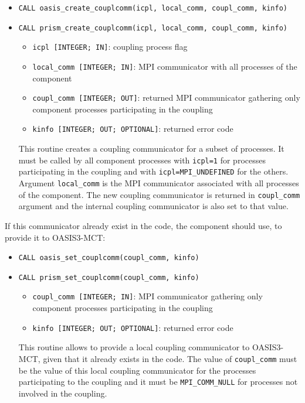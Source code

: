 \begin{itemize}
\item {\tt CALL oasis\_create\_couplcomm(icpl, local\_comm, coupl\_comm, kinfo)} 
\item {\tt CALL prism\_create\_couplcomm(icpl, local\_comm, coupl\_comm, kinfo)}
\begin{itemize}
\item {\tt icpl [INTEGER; IN]}: coupling process flag
\item {\tt local\_comm [INTEGER; IN]}: MPI communicator with all processes of the component
\item {\tt coupl\_comm [INTEGER; OUT]}: returned MPI communicator gathering only component processes participating in the coupling
\item {\tt kinfo [INTEGER; OUT; OPTIONAL]}: returned error code
\end{itemize}

This routine creates a coupling communicator for a subset of processes. It must be called by all component processes with {\tt icpl=1} for processes participating in the coupling and with {\tt icpl=MPI\_UNDEFINED} for the others. Argument {\tt local\_comm} is the MPI communicator associated with all processes of the component. The new coupling communicator is returned in {\tt coupl\_comm} argument and the internal coupling communicator is also set to that value.  
\end{itemize}

If this communicator already exist in the code, the component should use, to provide it to OASIS3-MCT:  

\begin{itemize} 
\item {\tt CALL oasis\_set\_couplcomm(coupl\_comm, kinfo)}
\item {\tt CALL prism\_set\_couplcomm(coupl\_comm, kinfo)}
\begin{itemize}
\item {\tt coupl\_comm [INTEGER; IN]}: MPI communicator gathering only component processes participating in the coupling
\item {\tt kinfo [INTEGER; OUT; OPTIONAL]}: returned error code
\end{itemize}

This routine allows to provide a local coupling communicator to OASIS3-MCT, given that it already exists in the code. The value of {\tt coupl\_comm} must be the value of this local coupling communicator for the processes participating to the coupling and it must be {\tt MPI\_COMM\_NULL} for processes not involved in the coupling.  
\end{itemize}

